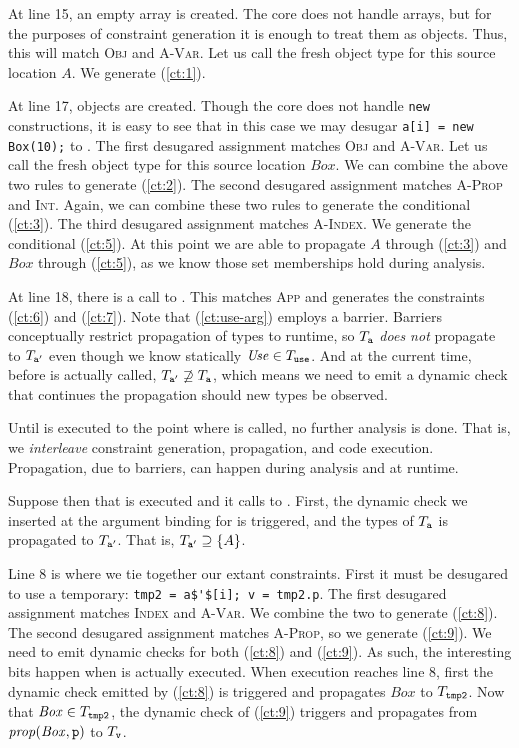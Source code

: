 At line 15, an empty array is created. The core does not handle arrays, but
for the purposes of constraint generation it is enough to treat them as
objects. Thus, this will match \textsc{Obj} and \textsc{A-Var}. Let us call
the fresh object type for this source location $A$. We generate (\ref{ct:1}).

At line 17,  objects are created. Though the core does not handle
\lstinline{new} constructions, it is easy to see that in this case we may
desugar \lstinline{a[i] = new Box(10);} to . The first desugared assignment matches \textsc{Obj} and
\textsc{A-Var}. Let us call the fresh object type for this source location
$\mathit{Box}$. We can combine the above two rules to generate (\ref{ct:2}).
The second desugared assignment matches \textsc{A-Prop} and
\textsc{Int}. Again, we can combine these two rules to generate the
conditional (\ref{ct:3}).  The third desugared assignment matches
\textsc{A-Index}. We generate the conditional (\ref{ct:5}). At this point we are able to propagate $\mathit{A}$ through (\ref{ct:3}) and $\mathit{Box}$ through (\ref{ct:5}), as we know those set memberships hold during analysis.

At line 18, there is a call to . This matches \textsc{App} and
generates the constraints (\ref{ct:6}) and (\ref{ct:7}). Note that
(\ref{ct:use-arg}) employs a barrier. Barriers conceptually restrict propagation
of types to runtime, so $T_{\texttt{a}}$ \emph{does not} propagate to
$T_{\texttt{a}'}$ even though we know statically $\mathit{Use} \in
T_{\texttt{use}}$. And at the current time, before  is actually
called, $T_{\texttt{a}'} \not\supseteq T_{\texttt{a}}$, which means we need to
emit a dynamic check that continues the propagation should new types be
observed.

Until  is executed to the point where  is called, no
further analysis is done. That is, we \emph{interleave} constraint generation,
propagation, and code execution. Propagation, due to barriers, can happen
during analysis and at runtime.

Suppose then that  is executed and it calls to . First,
the dynamic check we inserted at the argument binding for  is
triggered, and the types of $T_{\texttt{a}}$ is propagated to
$T_{\texttt{a}'}$. That is, $T_{\texttt{a}'} \supseteq \{A\}$.

Line 8 is where we tie together our extant constraints. First it must be
desugared to use a temporary: \lstinline{tmp2 = a$'$[i]; v = tmp2.p}. The
first desugared assignment matches \textsc{Index} and \textsc{A-Var}. We
combine the two to generate (\ref{ct:8}). The second desugared assignment
matches \textsc{A-Prop}, so we generate (\ref{ct:9}). We need to emit dynamic
checks for both (\ref{ct:8}) and (\ref{ct:9}). As such, the interesting bits
happen when  is actually executed. When execution reaches line 8,
first the dynamic check emitted by (\ref{ct:8}) is triggered and propagates
$\mathit{Box}$ to $T_{\texttt{tmp2}}$. Now that $\mathit{Box} \in
T_{\texttt{tmp2}}$, the dynamic check of (\ref{ct:9}) triggers and propagates
 from $\mathit{prop}(\mathit{Box}, \texttt{p})$ to $T_{\texttt{v}}$.

